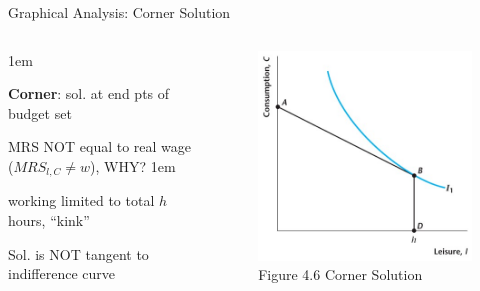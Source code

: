 \documentclass[11pt,aspectratio=43]{beamer}
\let\olditemize=\itemize
\let\endolditemize=\enditemize
\renewenvironment{itemize}{\olditemize \itemsep1em}{\endolditemize}
\theoremstyle{definition}
\begin{document}
\begin{frame}{Graphical Analysis: Corner Solution}
\label{slide:Graphical_Analysis__Corner_Solution}
    \begin{columns}
        \begin{column}{0.5\textwidth}
            \begin{itemize}
                \item \textbf{Corner}: sol. at end pts of budget set
                \item \alert{MRS} \alert{NOT} equal to \alert{real wage} ($MRS_{l, C} \neq w$), WHY?
                \begin{itemize}
                    \item working limited to total $ h $ hours, ``kink''
                \end{itemize}
                \item Sol. is NOT tangent to indifference curve
            \end{itemize}
        \end{column}
        \begin{column}{0.5\textwidth}
            \begin{figure}
                \caption{Figure 4.6 Corner Solution}
                \includegraphics[width=\textwidth]{./figures/Figure4_6.jpg}
            \end{figure}
        \end{column}
    \end{columns}

\end{frame}
\end{document}
